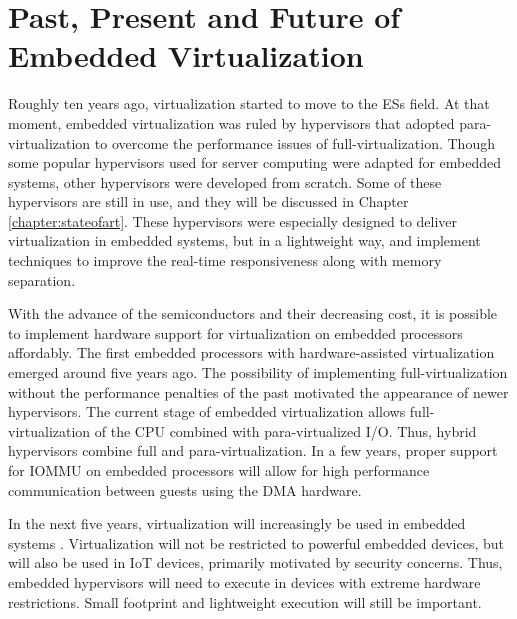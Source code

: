 \section{Past, Present and Future of Embedded Virtualization}
\label{section2:future}

Roughly ten years ago, virtualization started to move to the ESs field. At that moment, embedded virtualization was ruled by hypervisors that adopted para-virtualization to overcome the performance issues of full-virtualization. Though some popular hypervisors used for server computing were adapted for embedded systems, other hypervisors were developed from scratch. Some of these hypervisors are still in use, and they will be discussed in Chapter \ref{chapter:stateofart}. These hypervisors were especially designed to deliver virtualization in embedded systems, but in a lightweight way, and implement techniques to improve the real-time responsiveness along with memory separation. 

With the advance of the semiconductors and their decreasing cost, it is possible to implement hardware support for virtualization on embedded processors affordably. The first embedded processors with hardware-assisted virtualization emerged around five years ago. The possibility of implementing full-virtualization without the performance penalties of the past motivated the appearance of newer hypervisors. The current stage of embedded virtualization allows full-virtualization of the CPU combined with para-virtualized I/O. Thus, hybrid hypervisors combine full and para-virtualization. In a few years, proper support for IOMMU on embedded processors will allow for high performance communication between guests using the DMA hardware. 

In the next five years, virtualization will increasingly be used in embedded systems \cite{security-prpl}. Virtualization will not be restricted to powerful embedded devices, but will also be used in IoT devices, primarily motivated by security concerns. Thus, embedded hypervisors will need to execute in devices with extreme hardware restrictions. Small footprint and lightweight execution will still be important.



